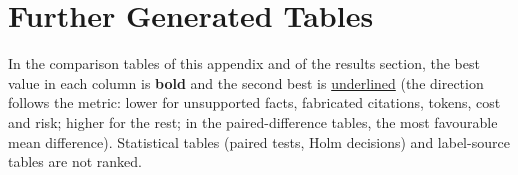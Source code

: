 \section{Further Generated Tables}
\label{app:tables}

\noindent In the comparison tables of this appendix and of the results section, the best value in each column is \textbf{bold} and the second best is \underline{underlined} (the direction follows the metric: lower for unsupported facts, fabricated citations, tokens, cost and risk; higher for the rest; in the paired-difference tables, the most favourable mean difference). Statistical tables (paired tests, Holm decisions) and label-source tables are not ranked.


